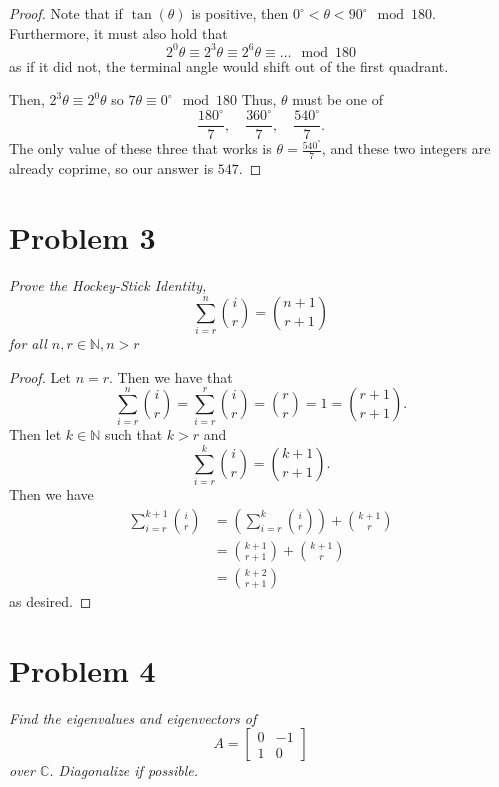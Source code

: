 \documentclass{article}
\begin{document}
\begin{proof}
    Note that if $\tan(\theta)$ is positive, then $0^\circ < \theta < 90^\circ \mod{180}$. Furthermore, it must also hold that \[
        2^0 \theta \equiv 2^3 \theta \equiv 2^6 \theta \equiv \dots \mod{180}
    \] as if it did not, the terminal angle would shift out of the first quadrant.

    Then, $2^3 \theta \equiv 2^0 \theta$ so  $7 \theta \equiv 0^\circ \mod{180}$ Thus, $\theta$ must be one of  \[
        \frac{180^\circ}{7}, \quad \frac{360^\circ}{7}, \quad \frac{540^\circ}{7}.
    \] The only value of these three that works is $\theta = \frac{540^\circ}{7}$, and these two integers are already coprime, so our answer is $547$.
\end{proof}

\pagebreak

\section*{Problem 3}
\textit{Prove the Hockey-Stick Identity, \[
        \sum^n_{i = r} \binom{i}{r} = \binom{n+1}{r+1}
\] for all $n, r \in  \mathbb{N}, n > r$}

\begin{proof}
    Let $n = r$. Then we have that 
     \[
         \sum_{i=r}^{n} \binom{i}{r} = \sum^r_{i=r} \binom{i}{r} = \binom{r}{r} = 1 = \binom{r+1}{r+1}.
    \] 
    Then let $k \in \mathbb{N}$ such that $k > r$ and  \[
        \sum_{i = r}^{k} \binom{i}{r} = \binom{k+1}{r+1}.
    \] Then we have
    \begin{align*}
        \sum^{k+1}_{i=r} \binom{i}{r} &= \left( \sum^k_{i=r} \binom{i}{r} \right) + \binom{k+1}{r}\\
    &= \binom{k+1}{r+1} + \binom{k+1}{r} \\ 
    &= \binom{k+2}{r+1}
    \end{align*} as desired.
    
\end{proof}
\pagebreak

\section*{Problem 4}
\textit{Find the eigenvalues and eigenvectors of \[
        A = \begin{bmatrix} 0 & -1 \\ 1 & 0 \end{bmatrix} 
\] over $\mathbb{C}$. Diagonalize if possible.}
\end{document}
